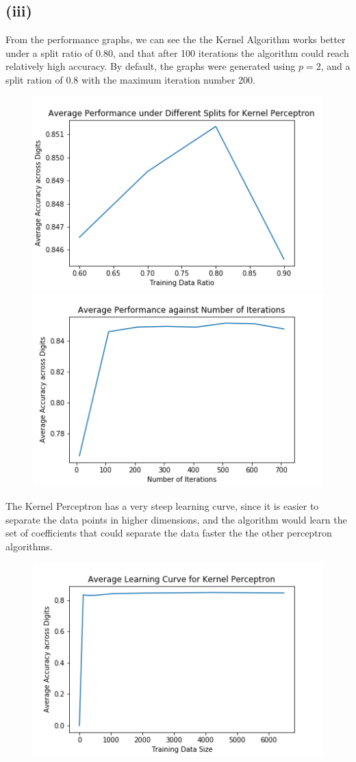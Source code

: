 \documentclass[twoside,11pt]{homework}
\begin{document}
\subsection*{(iii)}
	From the performance graphs, we can see the the Kernel Algorithm works better under a split ratio of 0.80, and
	that after 100 iterations the algorithm could reach relatively high accuracy. By default, the graphs were generated using $p=2$,
	and a split ration of 0.8 with the maximum iteration number 200.
	\begin{figure}[H]
		\includegraphics[scale=0.5]{q6/img/splits_ker.png}
		\includegraphics[scale=0.5]{q6/img/iterations_ker.png}
	\end{figure}
	The Kernel Perceptron has a very steep learning curve, since it is easier to separate the data points in higher dimensions, and
	the algorithm would learn the set of coefficients that could separate the data faster the the other perceptron algorithms.
	\begin{figure}[H]
		\includegraphics[scale=0.5]{q6/img/learning_ker.png}
	\end{figure}
\end{document}
